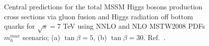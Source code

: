 \begin{figure}[tp]
     \begin{center}

    \end{center}
    \caption{Central predictions for the total MSSM Higgs bosons production cross sections via gluon fusion and Higgs radiation off
	bottom quarks  for $\sqrt{s} = 7$ TeV using NNLO and NLO MSTW2008 PDFs $m_h^{max}$ scenario; (a) $\tan\beta  = 5$, (b) $\tan\beta  = 30$.
	Ref.~\cite{LHCxsec1}. }

   \label{fig:xsec}
\end{figure}


